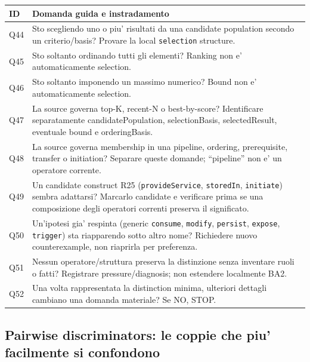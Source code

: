 \documentclass[11pt,a4paper]{article}
\begin{document}
\begin{longtable}{L{17mm}L{122mm}}
\toprule
\textbf{ID} & \textbf{Domanda guida e instradamento} \\
\midrule\endhead
Q44 & Sto scegliendo uno o piu' risultati da una candidate population secondo un criterio/basis? Provare la local \texttt{selection} structure. \\
Q45 & Sto soltanto ordinando tutti gli elementi? Ranking non e' automaticamente selection. \\
Q46 & Sto soltanto imponendo un massimo numerico? Bound non e' automaticamente selection. \\
Q47 & La source governa top-K, recent-N o best-by-score? Identificare separatamente candidatePopulation, selectionBasis, selectedResult, eventuale bound e orderingBasis. \\
Q48 & La source governa membership in una pipeline, ordering, prerequisite, transfer o initiation? Separare queste domande; ``pipeline'' non e' un operatore corrente. \\
Q49 & Un candidate construct R25 (\texttt{provideService}, \texttt{storedIn}, \texttt{initiate}) sembra adattarsi? Marcarlo candidate e verificare prima se una composizione degli operatori correnti preserva il significato. \\
Q50 & Un'ipotesi gia' respinta (generic \texttt{consume}, \texttt{modify}, \texttt{persist}, \texttt{expose}, \texttt{trigger}) sta riapparendo sotto altro nome? Richiedere nuovo counterexample, non riaprirla per preferenza. \\
Q51 & Nessun operatore/struttura preserva la distinzione senza inventare ruoli o fatti? Registrare pressure/diagnosis; non estendere localmente BA2. \\
Q52 & Una volta rappresentata la distinction minima, ulteriori dettagli cambiano una domanda materiale? Se NO, STOP. \\
\bottomrule
\end{longtable}

\subsection{Pairwise discriminators: le coppie che piu' facilmente si confondono}
\end{document}
